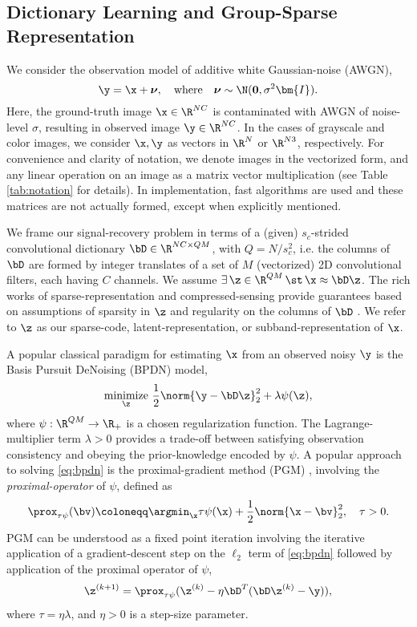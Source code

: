 \documentclass[lettersize,journal]{IEEEtran}
\newcommand{\IDMAT}{\bm{I}}
\begin{document}
\subsection{Dictionary Learning and Group-Sparse Representation}
We consider the observation model of additive white Gaussian-noise (AWGN),
\begin{equation} \label{eq:awgn}
    \y = \x + \boldsymbol{\nu}, \quad \textnormal{where}\quad \boldsymbol{\nu}\sim\N(\boldsymbol{0}, \sigma^2 \IDMAT).
\end{equation}
Here, the ground-truth image $\x \in \R^{NC}$ is contaminated with AWGN of noise-level $\sigma$, resulting in
observed image $\y \in \R^{NC}$. In the cases of grayscale and color images,
we consider $\x, \y$ as vectors in $\R^{N}$ or $\R^{N3}$, respectively. 
For convenience and clarity of notation, we denote images in the vectorized form, and any
linear operation on an image as a matrix vector multiplication (see Table
\ref{tab:notation} for details). In implementation, fast algorithms are used
and these matrices are not actually formed, except when explicitly mentioned. 

We frame our signal-recovery problem in terms of a (given)
$s_c$-strided convolutional dictionary $\bD \in \R^{NC \times QM}$, with $Q=N/s_c^2$, i.e. the
columns of $\bD$ are
formed by integer translates of a set of $M$ (vectorized) 2D convolutional
filters, each having $C$ channels.
We assume $\exists \,
\z \in \R^{QM}\, \st \, \x \approx \bD\z$. 
The rich works of sparse-representation and compressed-sensing
provide guarantees based on assumptions of sparsity in $\z$ and regularity on
the columns of $\bD$ \cite{Mallat}. We refer to $\z$ as our sparse-code,
latent-representation, or subband-representation of $\x$.

A popular classical paradigm for estimating $\x$ from an observed
noisy $\y$ is the Basis Pursuit DeNoising (BPDN) model, 
\begin{equation} \label{eq:bpdn}
\underset{\z}{\mathrm{minimize}} ~ \frac{1}{2}\norm{\y -\bD\z}_2^2 + \lambda \psi(\z),
\end{equation}
where $\psi : \R^{QM} \rightarrow \R_+$ is a chosen regularization function. The
Lagrange-multiplier term $\lambda > 0$ provides a trade-off between satisfying
observation consistency and obeying the prior-knowledge encoded by $\psi$. A
popular approach to solving \eqref{eq:bpdn} is the proximal-gradient method
(PGM) \cite{Beck2009}, involving the {\it proximal-operator} of $\psi$, defined as  
\begin{equation} \label{eq:prox}
    \prox_{\tau \psi}(\bv) \coloneqq \argmin_{\x} \tau \psi(\x) +
    \frac{1}{2}\norm{\x - \bv}_2^2, \quad \tau > 0.
\end{equation}
PGM can be understood as a fixed point iteration involving the iterative application
of a gradient-descent step on the $\ell_2$ term of \eqref{eq:bpdn} followed by 
application of the proximal operator of $\psi$,
\begin{equation} \label{eq:pgm}
\z^{(k+1)} = \prox_{\tau \psi}(\z^{(k)} - \eta \bD^T(\bD\z^{(k)} - \y)),
\end{equation}
where $\tau =\eta\lambda$,  and $\eta > 0$ is a step-size parameter.
\end{document}
